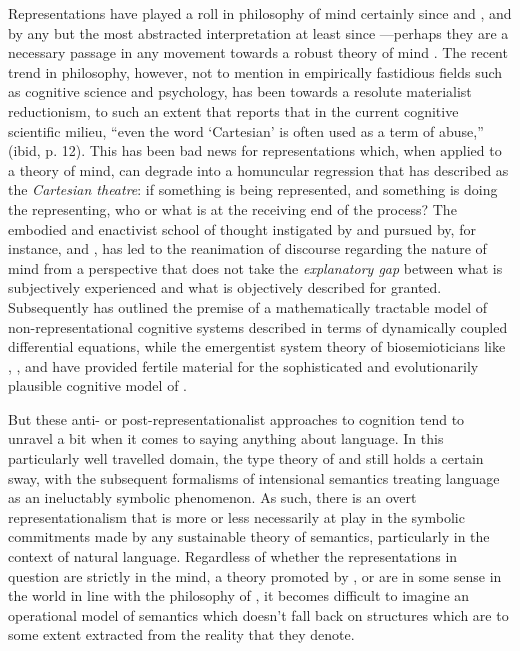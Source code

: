 Representations have played a roll in philosophy of mind certainly since \cite{Descartes1911} and \cite{Hobbes1651}, and by any but the most abstracted interpretation at least since \cite{Plato1892}---perhaps they are a necessary passage in any movement towards a robust theory of mind \citep[if, in fact, such a theory is even desirable---\emph{cf}][]{Rorty1979}.  The recent trend in philosophy, however, not to mention in empirically fastidious fields such as cognitive science and psychology, has been towards a resolute materialist reductionism, to such an extent that \cite{Rowlands2010} reports that in the current cognitive scientific milieu, ``even the word `Cartesian' is often used as a term of abuse,'' (ibid, p. 12).  This has been bad news for representations which, when applied to a theory of mind, can degrade into a homuncular regression that \cite{Dennett1991} has described as the \emph{Cartesian theatre}: if something is being represented, and something is doing the representing, who or what is at the receiving end of the process?  The embodied and enactivist school of thought instigated by \cite{MaturanaEA1987} and pursued by, for instance, \cite{Haugeland1993} and \cite{Thompson2007}, has led to the reanimation of discourse regarding the nature of mind from a perspective that does not take the \emph{explanatory gap} \citep{Levine1983} between what is subjectively experienced and what is objectively described for granted.  Subsequently \cite{VanGelder1995} has outlined the premise of a mathematically tractable model of non-representational cognitive systems described in terms of dynamically coupled differential equations, while the emergentist system theory of biosemioticians like \cite{Kauffman1995}, \cite{Hoffmeyer1997}, and \cite{Pattee2001} have provided fertile material for the sophisticated and evolutionarily plausible cognitive model of \cite{Deacon2011}.

But these anti- or post-representationalist approaches to cognition tend to unravel a bit when it comes to saying anything about language.  In this particularly well travelled domain, the type theory of \cite{WhiteheadEA1927} and \cite{Church1940} still holds a certain sway, with the subsequent formalisms of intensional semantics \citep{FoxEA2005} treating language as an ineluctably symbolic phenomenon.  As such, there is an overt representationalism that is more or less necessarily at play in the symbolic commitments made by any sustainable theory of semantics, particularly in the context of natural language.  Regardless of whether the representations in question are strictly in the mind, a theory promoted by \cite{Fodor2001}, or are in some sense in the world in line with the philosophy of \cite{Putnam1975}, it becomes difficult to imagine an operational model of semantics which doesn't fall back on structures which are to some extent extracted from the reality that they denote.

